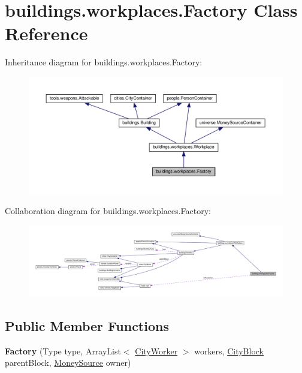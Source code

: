 \hypertarget{classbuildings_1_1workplaces_1_1_factory}{}\section{buildings.\+workplaces.\+Factory Class Reference}
\label{classbuildings_1_1workplaces_1_1_factory}


Inheritance diagram for buildings.\+workplaces.\+Factory\+:\nopagebreak
\begin{figure}[H]
\begin{center}
\leavevmode
\includegraphics[width=350pt]{classbuildings_1_1workplaces_1_1_factory__inherit__graph}
\end{center}
\end{figure}


Collaboration diagram for buildings.\+workplaces.\+Factory\+:
\nopagebreak
\begin{figure}[H]
\begin{center}
\leavevmode
\includegraphics[width=350pt]{classbuildings_1_1workplaces_1_1_factory__coll__graph}
\end{center}
\end{figure}
\subsection*{Public Member Functions}
\begin{DoxyCompactItemize}
\item 
{\bfseries Factory} (Type type, Array\+List$<$ \hyperlink{classpeople_1_1cityworkers_1_1_city_worker}{City\+Worker} $>$ workers, \hyperlink{classcities_1_1_city_block}{City\+Block} parent\+Block, \hyperlink{classuniverse_1_1_money_source}{Money\+Source} owner)\hypertarget{classbuildings_1_1workplaces_1_1_factory_aa6d7470db720656ef3d93f933ac55409}{}\label{classbuildings_1_1workplaces_1_1_factory_aa6d7470db720656ef3d93f933ac55409}

\end{DoxyCompactItemize}
